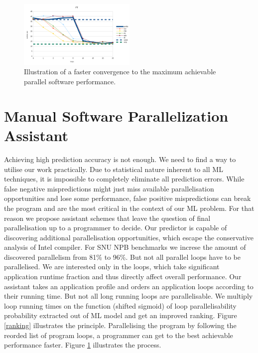 \documentclass{acaces}
\begin{document}
\begin{figure}
	\includegraphics[width=0.5\textwidth]{ft_parallelisation}
	\caption{Illustration of a faster convergence to the maximum achievable parallel software performance.}
	\label{convergence}
\end{figure}\null
\section{Manual Software Parallelization Assistant}
\label{predicting_parallel_loops}
\quad Achieving high prediction accuracy is not enough. We need to find a way to utilise our work practically. Due to statistical nature inherent to all ML techniques, it is impossible to completely eliminate all prediction errors. While false negative mispredictions might just miss available parallelisation opportunities and lose some performance, false positive mispredictions can break the program and are the most critical in the context of our ML problem. For that reason we propose assistant schemes that leave the question of final parallelisation up to a programmer to decide.\newline\null
\quad Our predictor is capable of discovering additional parallelisation opportunities, which escape the conservative analysis of Intel compiler. For SNU NPB benchmarks we increse the amount of discovered parallelism from 81\% to 96\%. But not all parallel loops have to be parallelised. We are interested only in the loops, which take significant application runtime fraction and thus directly affect overall performance. Our assistant takes an application profile and orders an application loops according to their running time. But not all long running loops are parallelisable. We multiply loop running times on the function (shifted sigmoid) of loop parallelisability probability extracted out of ML model and get an improved ranking. Figure \ref{ranking} illustrates the principle.
\quad Parallelising the program by following the reorded list of program loops, a programmer can get to the best achievable performance faster. Figure \ref{convergence} illustrates the process.   


\end{document}
